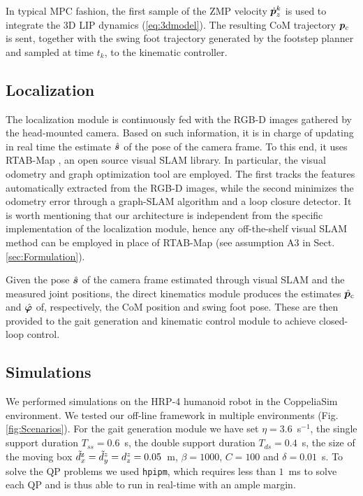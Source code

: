 In typical MPC fashion, the first sample of the ZMP velocity $\dot {{\bm{p}}}_z^k$ is used to integrate the 3D LIP dynamics (\ref{eq:3dmodel}). The resulting CoM trajectory ${\bm{p}}_c$ is sent, together with the swing foot trajectory generated by the footstep planner and sampled at time $t_k$, to the kinematic controller.

\subsection{Localization}
\label{sec:offlineCase:Localization}

The localization module is continuously fed with the RGB-D images gathered by the head-mounted camera.
Based on such information, it is in charge of updating in real time the estimate $\hat{{\bm{s}}}$ of the pose of the camera frame.
To this end, it uses RTAB-Map \cite{LaMi:19}, an open source visual SLAM library. 
In particular, the visual odometry and graph optimization tool are employed.
The first tracks the features automatically extracted from the RGB-D images, while the second minimizes the odometry error through a graph-SLAM algorithm and a loop closure detector.
It is worth mentioning that our architecture is independent from the specific implementation of the localization module, hence any off-the-shelf visual SLAM method can be employed in place of RTAB-Map (see assumption A3 in Sect. \ref{sec:Formulation}).

Given the pose $\hat{{\bm{s}}}$ of the camera frame estimated through visual SLAM and the measured joint positions, the direct kinematics module produces the estimates $\hat{{\bm{p}}}_{\rm c}$ and $\hat{{\bm{\varphi}}}$ of, respectively, the CoM position and swing foot pose. These are then provided to the gait generation and kinematic control module to achieve closed-loop control.

\subsection{Simulations}
\label{sec:offlineCase:Simulations}
We performed simulations on the HRP-4 humanoid robot in the CoppeliaSim environment. We tested our off-line framework in multiple environments (Fig. \ref{fig:Scenarios}). For the gait generation module we have set $\eta = 3.6$~s$^{-1}$, the single support duration $T_{ss}=0.6$~s, the double support duration $T_{ds}=0.4$~s, the size of the moving box $\tilde{d}_x^{\rm z}=\tilde{d}_y^z=d_z^z=0.05$~m, $\beta=1000$, $C=100$ and $\delta = 0.01$~s. 
To solve the QP problems we used \texttt{hpipm}, which requires less than $1$~ms to solve each QP and is thus able to run in real-time with an ample margin.

